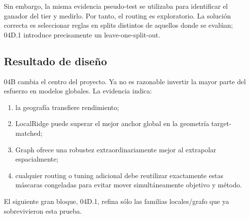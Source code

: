 Sin embargo, la misma evidencia pseudo-test se utilizaba para identificar el ganador del tier
y medirlo. Por tanto, el routing es exploratorio. La solución correcta es seleccionar reglas
en splits distintos de aquellos donde se evalúan; 04D.1 introduce precisamente un
leave-one-split-out.

\subsection{Resultado de diseño}

04B cambia el centro del proyecto. Ya no es razonable invertir la mayor parte del esfuerzo en
modelos globales. La evidencia indica:
\begin{enumerate}
\item la geografía transfiere rendimiento;
\item LocalRidge puede superar el mejor anchor global en la geometría target-matched;
\item Graph ofrece una robustez extraordinariamente mejor al extrapolar espacialmente;
\item cualquier routing o tuning adicional debe reutilizar exactamente estas máscaras
congeladas para evitar mover simultáneamente objetivo y método.
\end{enumerate}

El siguiente gran bloque, 04D.1, refina sólo las familias locales/grafo que ya sobrevivieron
esta prueba.
